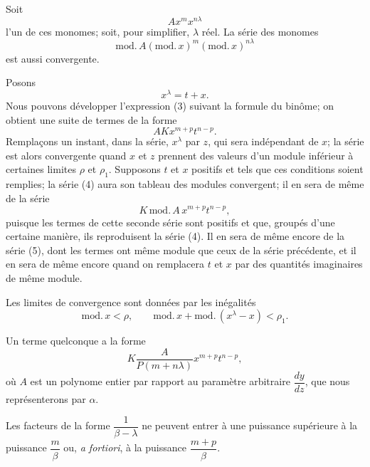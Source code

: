 \documentclass[11pt]{article}
\begin{document}
Soit
\begin{equation*}\tag{3}
A x^m x^{n\lambda}
\end{equation*}
l’un de ces monomes; soit, pour simplifier, $\lambda$ réel. La série des monomes
\begin{equation*}\tag{4}
\mathrm{mod}.\,A(\mathrm{mod}.\,x)^m(\mathrm{mod}.\,x)^{n\lambda}
\end{equation*}
est aussi convergente.

Posons
\[
x^\lambda=t+x.
\]
Nous pouvons développer l’expression (3) suivant la formule du binôme; on obtient une suite de termes de la forme
\begin{equation*}\tag{5}
AKx^{m+p}t^{n-p}.
\end{equation*}
Remplaçons un instant, dans la série, $x^\lambda$ par $z$, qui sera indépendant de $x$; la série est alors convergente quand $x$ et $z$ prennent des valeurs d’un module inférieur à certaines limites $\rho$ et $\rho_1$. Supposons $t$ et $x$ positifs et tels que ces conditions soient remplies; la série (4) aura son tableau des modules convergent; il en sera de même de la série
\[
K\,\mathrm{mod}.\,A\,x^{m+p}t^{n-p},
\]
puisque les termes de cette seconde série sont positifs et que, groupés d’une certaine manière, ils reproduisent la série (4). Il en sera de même encore de la série (5), dont les termes ont même module que ceux de la série précédente, et il en sera de même encore quand on remplacera $t$ et $x$ par des quantités imaginaires de même module.

Les limites de convergence sont données par les inégalités
\[
\mathrm{mod}.\,x<\rho,
\qquad
\mathrm{mod}.\,x+\mathrm{mod}.\,(x^\lambda-x)<\rho_1.
\]

Un terme quelconque a la forme
\[
K\frac{A}{P(m+n\lambda)}x^{m+p}t^{n-p},
\]
où $A$ est un polynome entier par rapport au paramètre arbitraire $\dfrac{dy}{dz}$, que nous représenterons par $\alpha$.

Les facteurs de la forme $\dfrac{1}{\beta-\lambda}$ ne peuvent entrer à une puissance supérieure à la puissance $\dfrac{m}{\beta}$ ou, \emph{a fortiori}, à la puissance $\dfrac{m+p}{\beta}$.
\end{document}
